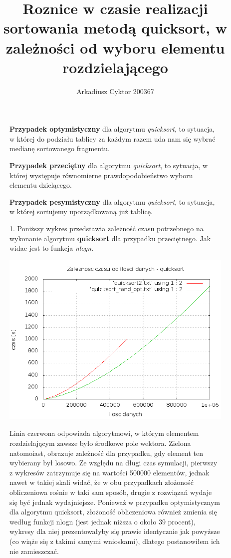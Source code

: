 \documentclass[a4paper,11pt]{report}
\title{Roznice w czasie realizacji sortowania metodą quicksort, w zależności od wyboru elementu rozdzielającego}
\author{Arkadiusz Cyktor 200367}
\begin{document}
\maketitle

\begin{figure}
\textbf{Przypadek optymistyczny} dla algorytmu \emph{quicksort}, to sytuacja, w której do podziału tablicy za każdym razem uda nam się wybrać medianę sortowanego fragmentu.
   \end{figure}
   \begin{figure}
\textbf{Przypadek przeciętny} dla algorytmu \emph{quicksort}, to sytuacja, w której występuje równomierne prawdopodobieństwo wyboru elementu dzielącego.
   \end{figure}
   \begin{figure}
\textbf{Przypadek pesymistyczny} dla algorytmu \emph{quicksort}, to sytuacja, w której sortujemy uporządkowaną już tablicę.
   \end{figure}



\begin{figure}
  1. Poniższy wykres przedstawia zależność czasu potrzebnego na wykonanie algorytmu \textbf{quicksort} dla przypadku przeciętnego. Jak widac jest to funkcja \emph{nlogn}.
   \begin{center} \includegraphics[scale=0.55]{./quicksort_opt.png}\end{center}
   Linia czerwona odpowiada algorytmowi, w którym elementem rozdzielającym zawsze było środkowe pole wektora. Zielona natomoiast, obrazuje zależność dla przypadku, gdy element ten wybierany był losowo.
   Ze względu na długi czas symulacji, pierwszy z wykresów zatrzymuje się na wartości 500000 elementów, jednak nawet w takiej skali widać, że w obu przypadkach złożoność obliczeniowa rośnie w taki sam sposób, drugie z rozwiązań wydaje się być jednak wydajniejsze. Ponieważ w przypadku optymistycznym dla algorytmu quicksort, złożoność obliczeniowa również zmienia się według funkcji nlogn (jest jednak niższa o około 39 procent), wykresy dla niej prezentowałyby się prawie identycznie jak powyższe (co wiąże się z takimi samymi wnioskami), dlatego postanowiłem ich nie zamieszczać. 
   \end{figure}
\end{document}
